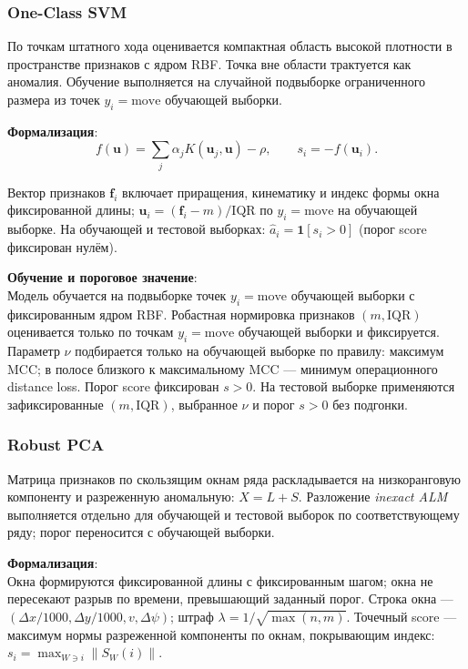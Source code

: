 \documentclass[a4paper,12pt]{report}
\begin{document}
	\subsubsection{One-Class SVM}
	По точкам штатного хода оценивается компактная область высокой плотности в пространстве признаков с ядром RBF. Точка вне области трактуется как аномалия. Обучение выполняется на случайной подвыборке ограниченного размера из точек $y_i=\mathrm{move}$ обучающей выборки.

	\textbf{Формализация}:\\
	$$f(\mathbf u)=\sum_j \alpha_j K(\mathbf u_j,\mathbf u)-\rho, \qquad s_i=-f(\mathbf u_i).$$

	Вектор признаков $\mathbf f_i$ включает приращения, кинематику и индекс формы окна фиксированной длины; $\mathbf u_i=(\mathbf f_i-m)/\mathrm{IQR}$ по $y_i=\mathrm{move}$ на обучающей выборке. На обучающей и тестовой выборках: $\hat a_i=\mathbf{1}[s_i>0]$ (порог score фиксирован нулём).

	\textbf{Обучение и пороговое значение}:\\
	Модель обучается на подвыборке точек $y_i=\mathrm{move}$ обучающей выборки с фиксированным ядром RBF. Робастная нормировка признаков $(m,\mathrm{IQR})$ оценивается только по точкам $y_i=\mathrm{move}$ обучающей выборки и фиксируется. Параметр $\nu$ подбирается только на обучающей выборке по правилу: максимум MCC; в полосе близкого к максимальному MCC — минимум операционного distance loss. Порог score фиксирован $s>0$. На тестовой выборке применяются зафиксированные $(m,\mathrm{IQR})$, выбранное $\nu$ и порог $s>0$ без подгонки.

	\subsubsection{Robust PCA}
	Матрица признаков по скользящим окнам ряда раскладывается на низкоранговую компоненту и разреженную аномальную: $X=L+S$. Разложение \textit{inexact ALM} выполняется отдельно для обучающей и тестовой выборок по соответствующему ряду; порог переносится с обучающей выборки.

	\textbf{Формализация}:\\
	Окна формируются фиксированной длины с фиксированным шагом; окна не пересекают разрыв по времени, превышающий заданный порог. Строка окна — $\left(\Delta x/1000,\Delta y/1000,v,\Delta\psi\right)$; штраф $\lambda=1/\sqrt{\max(n,m)}$. Точечный score — максимум нормы разреженной компоненты по окнам, покрывающим индекс: $s_i=\max_{W\ni i}\|S_W(i)\|$.
\end{document}
